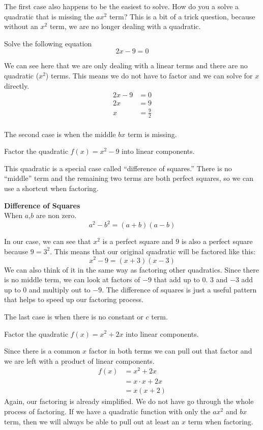 \documentclass{ximera}
\begin{document}
The first case also happens to be the easiest to solve. How do you a solve a quadratic that is missing the $ax^2$ term? This is a bit of a trick question, because without an $x^2$ term, we are no longer dealing with a quadratic. 
\begin{example}
Solve the following equation
\[
2x-9=0
\]

\begin{explanation}
We can see here that we are only dealing with a linear terms and there are no quadratic ($x^2$) terms. This means we do not have to factor and we can solve for $x$ directly.
\begin{align*}
2x-9&=0\\
2x&=9\\
x&=\frac{9}{2}\\
\end{align*}
\end{explanation}
\end{example}
The second case is when the middle $bx$ term is missing. 
\begin{example}
Factor the quadratic $f(x)=x^2-9$ into linear components.\\

\begin{explanation}
This quadratic is a special case called ``difference of squares.'' There is no ``middle'' term and the remaining two terms are both perfect squares, so we can use a shortcut when factoring.
\begin{callout}
\textbf{Difference of Squares}\\
When $a$,$b$ are non zero.
\[
a^2-b^2=(a+b)(a-b)
\]
\end{callout}
In our case, we can see that $x^2$ is a perfect square and $9$ is also a perfect square because $9=3^2$. This means that our original quadratic will be factored like this:
\[
x^2-9=(x+3)(x-3)
\]
We can also think of it in the same way as factoring other quadratics. Since there is no middle term, we can look at factors of $-9$ that add up to $0$. $3$ and $-3$ add up to $0$ and multiply out to $-9$. The difference of squares is just a useful pattern that helps to speed up our factoring process.
\end{explanation}
\end{example}
The last case is when there is no constant or $c$ term. 
\begin{example}
Factor the quadratic $f(x) = x^2+2x$ into linear components.\\

\begin{explanation}
Since there is a common $x$ factor in both terms we can pull out that factor and we are left with a product of linear components. 
\begin{align*}
f(x) &= x^2+2x\\
&= x\cdot x+2x\\
&=x(x+2)
\end{align*}
Again, our factoring is already simplified. We do not have go through the whole process of factoring. If we have a quadratic function with only the $ax^2$ and $bx$ term, then we will always be able to pull out at least an $x$ term when factoring.
\end{explanation}
\end{example}
\end{document}
